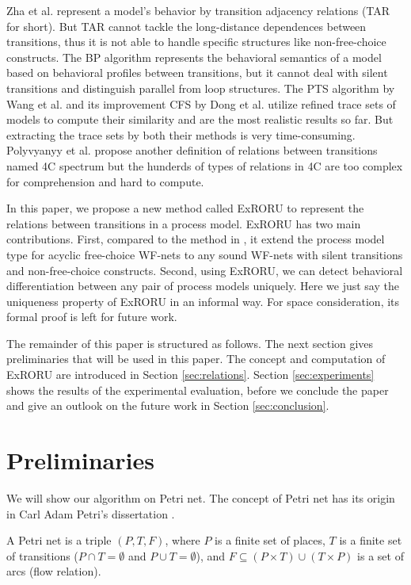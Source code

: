 \documentclass{llncs}
\begin{document}
Zha et al. \cite{zha2010workflow} represent a model's behavior by transition adjacency relations (TAR for short). But TAR cannot tackle the long-distance dependences between transitions, thus it is not able to handle specific structures like non-free-choice constructs. The BP algorithm \cite{weidlich2011efficient} represents the behavioral semantics of a model based on behavioral profiles between transitions, but it cannot deal with silent transitions and distinguish parallel from loop structures. The PTS algorithm by Wang et al. \cite{wang2010behavioral} and its improvement CFS by Dong et al. \cite{dong2014cfs} utilize refined trace sets of models to compute their similarity and are the most realistic results so far. But extracting the trace sets by both their methods is very time-consuming. Polyvyanyy et al. \cite{polyvyanyy20144c} propose another definition of relations between transitions named 4C spectrum but the hunderds of types of relations in 4C are too complex for comprehension and hard to compute. %

In this paper, we propose a new method called ExRORU to represent the relations between transitions in a process model. ExRORU has two main contributions. First, compared to the method in \cite{jin2014computing}, it extend the process model type for acyclic free-choice WF-nets to any sound WF-nets with silent transitions and non-free-choice constructs. Second, using ExRORU, we can detect behavioral differentiation between any pair of process models uniquely. Here we just say the uniqueness property of ExRORU in an informal way. For space consideration, its formal proof is left for future work.

The remainder of this paper is structured as follows. The next section gives preliminaries that will be used in this paper. The concept and computation of ExRORU are introduced in Section \ref{sec:relations}. Section \ref{sec:experiments} shows the results of the experimental evaluation, before we conclude the paper and give an outlook on the future work in Section \ref{sec:conclusion}.

\section{Preliminaries}\label{sec:preliminaries}
We will show our algorithm on Petri net. The concept of Petri net has its origin in Carl Adam Petri's dissertation \cite{petri1966kommunikation}.

\begin{definition}\label{def:petrinet}
A Petri net is a triple $(P,T,F)$, where $P$ is a finite set of places, $T$ is a finite set of transitions ($P\cap T=\emptyset$ and $P\cup T=\emptyset$), and $F\subseteq(P\times T)\cup(T\times P)$ is a set of arcs (flow relation).
\end{definition}
\end{document}
